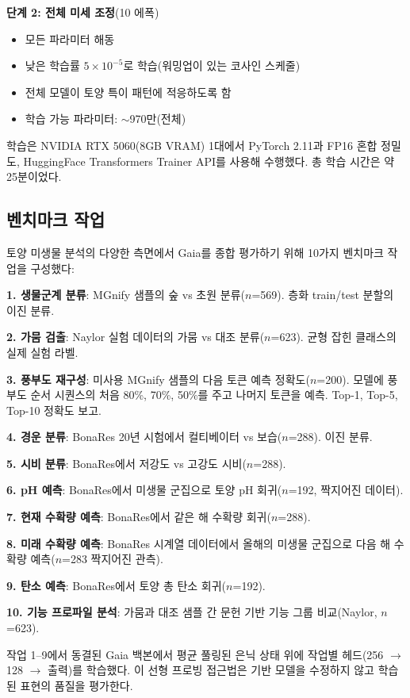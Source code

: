 \documentclass[11pt,a4paper]{article}
\begin{document}
\textbf{단계 2: 전체 미세 조정}(10 에폭)
\begin{itemize}[leftmargin=1.5em]
    \item 모든 파라미터 해동
    \item 낮은 학습률 $5 \times 10^{-5}$로 학습(워밍업이 있는 코사인 스케줄)
    \item 전체 모델이 토양 특이 패턴에 적응하도록 함
    \item 학습 가능 파라미터: $\sim$970만(전체)
\end{itemize}

학습은 NVIDIA RTX 5060(8GB VRAM) 1대에서 PyTorch 2.11과 FP16 혼합 정밀도, HuggingFace Transformers Trainer API를 사용해 수행했다. 총 학습 시간은 약 25분이었다.

\subsection{벤치마크 작업}

토양 미생물 분석의 다양한 측면에서 Gaia를 종합 평가하기 위해 10가지 벤치마크 작업을 구성했다:

\textbf{1. 생물군계 분류}: MGnify 샘플의 숲 vs 초원 분류($n$=569). 층화 train/test 분할의 이진 분류.

\textbf{2. 가뭄 검출}: Naylor 실험 데이터의 가뭄 vs 대조 분류($n$=623). 균형 잡힌 클래스의 실제 실험 라벨.

\textbf{3. 풍부도 재구성}: 미사용 MGnify 샘플의 다음 토큰 예측 정확도($n$=200). 모델에 풍부도 순서 시퀀스의 처음 80\%, 70\%, 50\%를 주고 나머지 토큰을 예측. Top-1, Top-5, Top-10 정확도 보고.

\textbf{4. 경운 분류}: BonaRes 20년 시험에서 컬티베이터 vs 보습($n$=288). 이진 분류.

\textbf{5. 시비 분류}: BonaRes에서 저강도 vs 고강도 시비($n$=288).

\textbf{6. pH 예측}: BonaRes에서 미생물 군집으로 토양 pH 회귀($n$=192, 짝지어진 데이터).

\textbf{7. 현재 수확량 예측}: BonaRes에서 같은 해 수확량 회귀($n$=288).

\textbf{8. 미래 수확량 예측}: BonaRes 시계열 데이터에서 올해의 미생물 군집으로 다음 해 수확량 예측($n$=283 짝지어진 관측).

\textbf{9. 탄소 예측}: BonaRes에서 토양 총 탄소 회귀($n$=192).

\textbf{10. 기능 프로파일 분석}: 가뭄과 대조 샘플 간 문헌 기반 기능 그룹 비교(Naylor, $n$=623).

작업 1--9에서 동결된 Gaia 백본에서 평균 풀링된 은닉 상태 위에 작업별 헤드(256 $\rightarrow$ 128 $\rightarrow$ 출력)를 학습했다. 이 선형 프로빙 접근법은 기반 모델을 수정하지 않고 학습된 표현의 품질을 평가한다.
\end{document}
